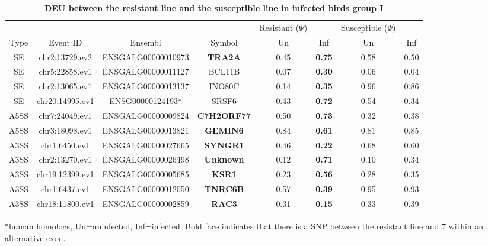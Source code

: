 \documentclass[10pt]{article}
\begin{document}
\begin{table}[!ht]
\caption{
\bf{DEU between the resistant line and the susceptible line in infected birds group I}}
\begin{tabular}{cccccccc}
\hline
& & & & Resistant ($\Psi$) & & Susceptible ($\Psi$) & \\
Type & Event ID & Ensembl & Symbol  & Un & Inf & Un & Inf \\
\hline
SE & chr2:13729.ev2 & ENSGALG00000010973 & \textbf{TRA2A} & 0.45 & \textbf{0.75} & 0.58 & 0.50 \\
SE & chr5:22858.ev1 & ENSGALG00000011127 & BCL11B & 0.07 & \textbf{0.30} & 0.06 & 0.04 \\
SE & chr2:13065.ev1 & ENSGALG00000013137 & INO80C & 0.14 & \textbf{0.35} & 0.96 & 0.86 \\
SE & chr20:14995.ev1 & ENSG00000124193* & SRSF6 & 0.43 & \textbf{0.72} & 0.54 & 0.34 \\
A5SS & chr7:24049.ev1 & ENSGALG00000009824 & \textbf{C7H2ORF77} & 0.50 & \textbf{0.73} & 0.32 & 0.38 \\
A5SS & chr3:18098.ev1 & ENSGALG00000013821 & \textbf{GEMIN6} & 0.84 & \textbf{0.61} & 0.81 & 0.85 \\
A3SS & chr1:6450.ev1 & ENSGALG00000027665 & \textbf{SYNGR1} & 0.46 & \textbf{0.22} & 0.68 & 0.60 \\
A3SS & chr2:13270.ev1 & ENSGALG00000026498 & \textbf{Unknown} & 0.12 & \textbf{0.71} & 0.10 & 0.34 \\
A3SS & chr19:12399.ev1 & ENSGALG00000005685 & \textbf{KSR1} & 0.23 & \textbf{0.56} & 0.28 & 0.35 \\
A3SS & chr1:6437.ev1 & ENSGALG00000012050 & \textbf{TNRC6B} & 0.57 & \textbf{0.39} & 0.95 & 0.93 \\
A3SS & chr18:11800.ev1 & ENSGALG00000002859 & \textbf{RAC3} & 0.31 & \textbf{0.15} & 0.33 & 0.39 \\
\hline
\end{tabular}
\begin{flushleft}
    *human homologs, Un=uninfected, Inf=infected.
    Bold face indicates that there is a SNP between the resistant line and 7 within an alternative exon.
\end{flushleft}
\label{tab:line67i_diff_line67u_one}
\end{table}
\end{document}

